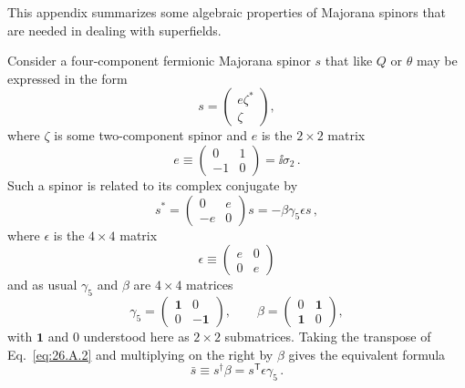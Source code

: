 

This appendix summarizes some algebraic properties of Majorana spinors that
are needed in dealing with superfields.

Consider a four-component fermionic Majorana spinor $s$ that like $Q$ or
$\theta$ may be expressed in the form
\begin{equation}
  s=
  \begin{pmatrix}
    e\zeta^*\\
    \zeta
  \end{pmatrix},
  \tag{26.A.1}\label{eq:26.A.1}
\end{equation}
where $\zeta$ is some two-component spinor and $e$ is the $2\times2$ matrix
\[
  e\equiv
  \begin{pmatrix}
    0&1\\
    -1&0
  \end{pmatrix}
  =\ii\sigma_2\,.
\]
Such a spinor is related to its complex conjugate by
\begin{equation}
  s^*=
  \begin{pmatrix}
    0&e\\
    -e&0
  \end{pmatrix}s
  =-\beta\gamma_5\epsilon s\,,
  \tag{26.A.2}\label{eq:26.A.2}
\end{equation}
where $\epsilon$ is the $4\times4$ matrix
\begin{equation}
  \epsilon\equiv
  \begin{pmatrix}
    e&0\\
    0&e
  \end{pmatrix}
  \tag{26.A.3}\label{eq:26.A.3}
\end{equation}
and as usual $\gamma_5$ and $\beta$ are $4\times4$ matrices
\[
  \gamma_5=
  \begin{pmatrix}
    \mathbf{1}&0\\
    0&-\mathbf{1}
  \end{pmatrix},
  \qquad
  \beta=
  \begin{pmatrix}
    0&\mathbf{1}\\
    \mathbf{1}&0
  \end{pmatrix},
\]
with $\mathbf{1}$ and $0$ understood here as $2\times2$ submatrices. Taking
the transpose of Eq.~\eqref{eq:26.A.2} and multiplying on the right by
$\beta$ gives the equivalent formula
\begin{equation}
  \bar{s}\equiv s^\dagger\beta=s^{\mathsf T}\epsilon\gamma_5\,.
  \tag{26.A.4}\label{eq:26.A.4}
\end{equation}


